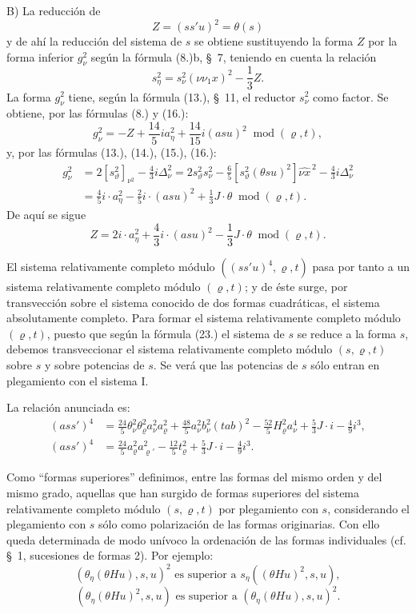 \documentclass[11pt]{article}
\newcommand{\A}{\Delta}
\newcommand{\modu}[1]{\;\operatorname{mod} #1}
\begin{document}
B) La reducción de
\[
Z=(ss'u)^2=\theta(s)
\]
y de ahí la reducción del sistema de $s$ se obtiene sustituyendo la forma $Z$ por la forma inferior $g_\nu^2$ según la fórmula (8.)b, \S\ 7, teniendo en cuenta la relación
\[
 s_\eta^2=s_\nu^2(\nu\nu_1x)^2-\frac13Z.
\]
La forma $g_\nu^2$ tiene, según la fórmula (13.), \S\ 11, el reductor $s_\nu^2$ como factor. Se obtiene, por las fórmulas (8.) y (16.):
\[
 g_\nu^2=-Z+\frac{14}{5}ia_\eta^2+\frac{14}{15}i(asu)^2
 \modu{(\varrho,t)},
\]
y, por las fórmulas (13.), (14.), (15.), (16.):
\[
\begin{aligned}
g_\nu^2&=2[s_\vartheta^2]_{\nu^2}-\frac43 i\A_\nu^2
      =2s_\vartheta^2s_\nu^2-\frac65[s_\vartheta^2(\theta su)^2]\widehat{\nu x}^{\,2}
        -\frac43i\A_\nu^2\\
&=\frac45i\cdot a_\eta^2-\frac25i\cdot(asu)^2+\frac13J\cdot\theta
\modu{(\varrho,t)}.
\end{aligned}
\]
De aquí se sigue
\[
\tag{23}
 Z=2i\cdot a_\eta^2+\frac43i\cdot(asu)^2-\frac13J\cdot\theta
 \modu{(\varrho,t)}.
\]

El sistema relativamente completo módulo $((ss'u)^4,\varrho,t)$ pasa por tanto a un sistema relativamente completo módulo $(\varrho,t)$; y de éste surge, por transvección sobre el sistema conocido de dos formas cuadráticas, el sistema absolutamente completo. Para formar el sistema relativamente completo módulo $(\varrho,t)$, puesto que según la fórmula (23.) el sistema de $s$ se reduce a la forma $s$, debemos transveccionar el sistema relativamente completo módulo $(s,\varrho,t)$ sobre $s$ y sobre potencias de $s$. Se verá que las potencias de $s$ sólo entran en plegamiento con el sistema I.

La relación anunciada es:
\[
\tag{22}
\begin{aligned}
(ass')^4&=\frac{24}{5}\theta_\nu^2\theta_\varrho^2a_\nu^2a_\varrho^2+
\frac{48}{5}a_\nu^2b_\nu^2(tab)^2-
\frac{52}{5}H_\varrho^2a_\nu^4+
\frac53J\cdot i-\frac49i^3,\\
(ass')^4&=\frac{24}{5}a_\varrho^2a_{\varrho'}^2-
\frac{12}{5}t_\varrho^2+\frac53J\cdot i-\frac49i^3.
\end{aligned}
\]

Como ``formas superiores'' definimos, entre las formas del mismo orden y del mismo grado, aquellas que han surgido de formas superiores del sistema relativamente completo módulo $(s,\varrho,t)$ por plegamiento con $s$, considerando el plegamiento con $s$ sólo como polarización de las formas originarias. Con ello queda determinada de modo unívoco la ordenación de las formas individuales (cf. \S\ 1, sucesiones de formas 2). Por ejemplo:
\[
(\theta_\eta(\theta Hu),s,u)^2\text{ es superior a }s_\eta((\theta Hu)^2,s,u),
\]
\[
(\theta_\eta(\theta Hu)^2,s,u)\text{ es superior a }(\theta_\eta(\theta Hu),s,u)^2.
\]
\end{document}
